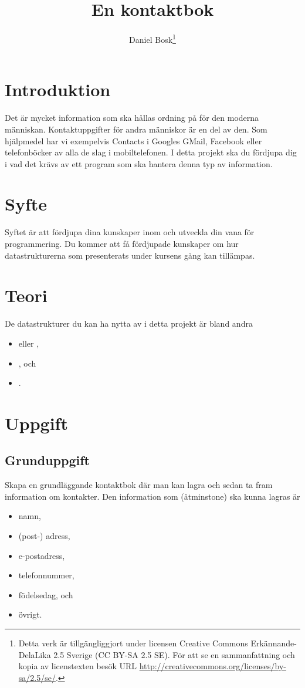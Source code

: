 \documentclass[a4paper]{miunasgn}
\title{En kontaktbok}
\author{Daniel Bosk\footnote{%
	Detta verk är tillgängliggjort under licensen Creative Commons 
	Erkännande-DelaLika 2.5 Sverige (CC BY-SA 2.5 SE).
	För att se en sammanfattning och kopia av licenstexten besök URL 
	\url{http://creativecommons.org/licenses/by-sa/2.5/se/}.
}}
\date{\svnId}
\begin{document}
\maketitle
\thispagestyle{foot}
\tableofcontents


\section{Introduktion}
\noindent
Det är mycket information som ska hållas ordning på för den moderna människan.
Kontaktuppgifter för andra människor är en del av den.
Som hjälpmedel har vi exempelvis Contacts i Googles GMail, Facebook eller 
telefonböcker av alla de slag i mobiltelefonen.
I detta projekt ska du fördjupa dig i vad det krävs av ett program som ska 
hantera denna typ av information.


\section{Syfte}
\noindent
Syftet är att fördjupa dina kunskaper inom och utveckla din vana för 
programmering.
Du kommer att få fördjupade kunskaper om hur datastrukturerna som presenterats 
under kursens gång kan tillämpas.


\section{Teori}
\label{sec:Theory}
\noindent
De datastrukturer du kan ha nytta av i detta projekt är bland andra
\begin{itemize}
	\item {} eller ,
	\item {}, och
	\item {}.
\end{itemize}


\section{Uppgift}
\label{sec:Tasks}
\noindent


\subsection{Grunduppgift}
\noindent
Skapa en grundläggande kontaktbok där man kan lagra och sedan ta fram 
information om kontakter.
Den information som (åtminstone) ska kunna lagras är
\begin{itemize}
	\item namn,
	\item (post-) adress,
	\item e-postadress,
	\item telefonnummer,
	\item födelsedag, och
	\item övrigt.
\end{itemize}
\end{document}
